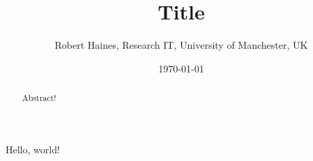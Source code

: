 \documentclass[11pt,a4paper]{article}
\begin{document}
\title{Title}
\author{Robert Haines, Research IT, University of Manchester, UK}
\date{\today}
\maketitle

\begin{abstract}
Abstract!
\end{abstract}

Hello, world!
\end{document}
